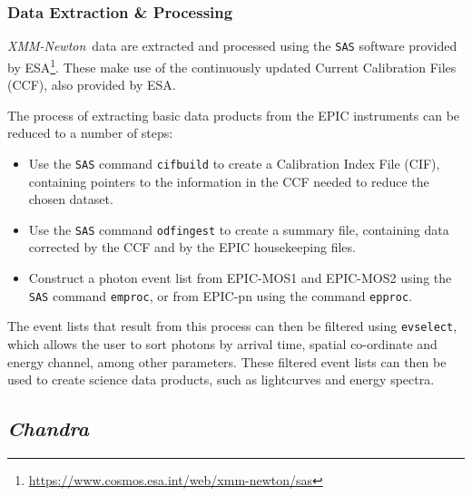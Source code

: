 \subsubsection{Data Extraction \& Processing}

\par \textit{XMM-Newton}\indexxmm\ data are extracted and processed using the \texttt{SAS} software \citep{Ibarra_sas} provided by ESA\footnote{\url{https://www.cosmos.esa.int/web/xmm-newton/sas}}.  These make use of the continuously updated Current Calibration Files (CCF), also provided by ESA.
\par The process of extracting basic data products from the EPIC instruments can be reduced to a number of steps:
\begin{itemize}
\item Use the \texttt{SAS} command \texttt{cifbuild} to create a Calibration Index File (CIF), containing pointers to the information in the CCF needed to reduce the chosen dataset.
\item Use the \texttt{SAS} command \texttt{odfingest} to create a summary file, containing data corrected by the CCF and by the EPIC housekeeping files.
\item Construct a photon event list from EPIC-MOS1 and EPIC-MOS2 using the \texttt{SAS} command \texttt{emproc}, or from EPIC-pn using the command \texttt{epproc}.
\end{itemize}
The event lists that result from this process can then be filtered using \texttt{evselect}, which allows the user to sort photons by arrival time, spatial co-ordinate and energy channel, among other parameters.  These filtered event lists can then be used to create science data products, such as lightcurves and energy spectra.

\subsection{\textit{Chandra}}

